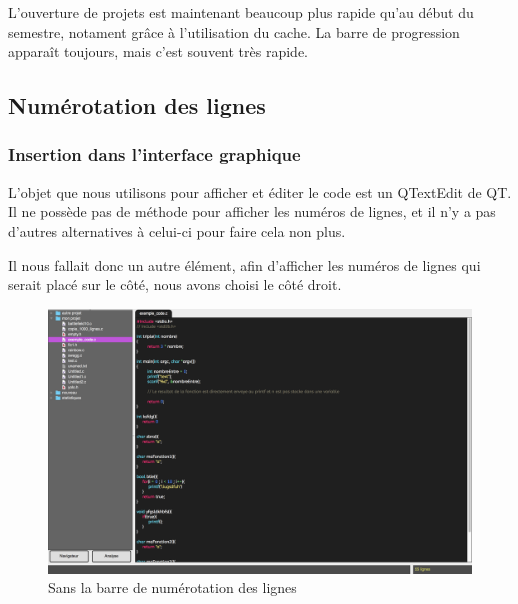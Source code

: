 \documentclass[a4paper,12pt]{article}
\begin{document}
		L'ouverture de projets est maintenant beaucoup plus rapide qu'au début du semestre, notament grâce à l'utilisation du cache. La barre de progression apparaît toujours, mais c'est souvent très rapide.
		
	\subsection{Numérotation des lignes}
	
	\subsubsection{Insertion dans l'interface graphique}

	L'objet que nous utilisons pour afficher et éditer le code est un QTextEdit de QT. Il ne possède pas de méthode pour afficher les numéros de lignes, et il n'y a pas d'autres alternatives à celui-ci pour faire cela non plus.
	
	Il nous fallait donc un autre élément, afin d'afficher les numéros de lignes qui serait placé sur le côté, nous avons choisi le côté droit.
	
		\begin{figure}[h!]
			\begin{center}
				\includegraphics[scale=0.17]{images/imgs_lines/avant}
				\caption{Sans la barre de numérotation des lignes}
			\end{center}
		\end{figure}
		
\end{document}
